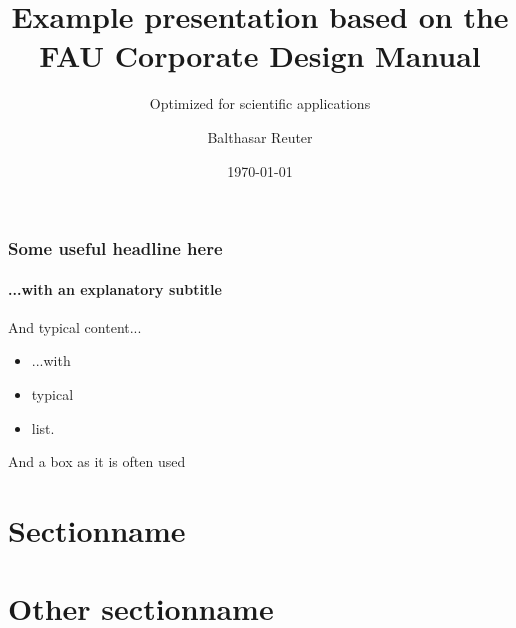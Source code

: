 \documentclass[final,12pt]{beamer}
\title{Example presentation based on the FAU Corporate Design Manual}
\subtitle{Optimized for scientific applications}
\author[B. Reuter]{Balthasar Reuter}
\institute[AM1]{Applied Mathematics I, Friedrich-Alexander-University Erlangen-N\"urnberg}
\date{\today}
\begin{document}
%

\frame[plain]{\titlepage} 

\begin{frame}
  \frametitle{Some useful headline here}
  \framesubtitle{...with an explanatory subtitle}

  And typical content...
  \begin{itemize}
    \item ...with
    \item typical
    \item list.
  \end{itemize}

  \begin{block}{And a box}
    as it is often used
  \end{block}
\end{frame}

\section{Sectionname}

\section*{Other sectionname}

\end{document}
